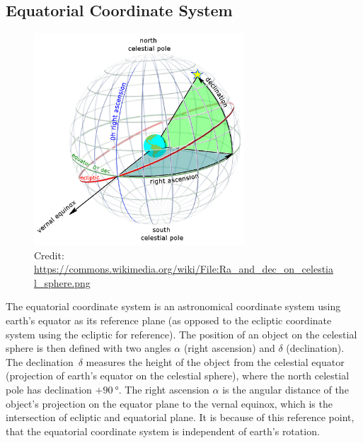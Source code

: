 \documentclass[11pt, a4paper]{article}
\numberwithin{equation}{section}
\begin{document}
\subsection{Equatorial Coordinate System}
\begin{figure}[h]
	\centering
	\includegraphics[width=0.7\textwidth]{./figures/equatorial_cs.png}
	\caption{Credit: \url{https://commons.wikimedia.org/wiki/File:Ra_and_dec_on_celestial_sphere.png}}
\end{figure}
The equatorial coordinate system is an astronomical coordinate system using earth's equator as its reference plane (as opposed to the ecliptic coordinate system using the ecliptic for reference).
The position of an object on the celestial sphere is then defined with two angles $\alpha$ (right ascension) and $\delta$ (declination).
The declination~$\delta$ measures the height of the object from the celestial equator (projection of earth's equator on the celestial sphere), where the north celestial pole has declination $+\SI{90}{\degree}$.
The right ascension $\alpha$ is the angular distance of the object's projection on the equator plane to the vernal equinox, which is the intersection of ecliptic and equatorial plane.
It is because of this reference point, that the equatorial coordinate system is independent of earth's rotation.
\end{document}

